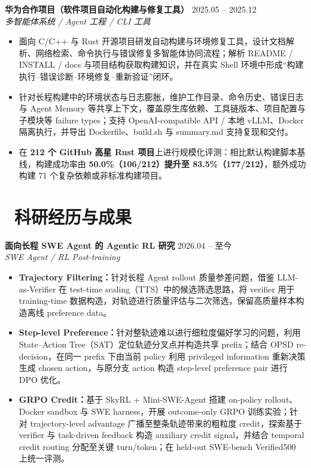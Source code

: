 \documentclass[10pt]{article}
\newlength{\interProjectSpacing}
\newcommand{\projectsep}{\vspace{\interProjectSpacing}}
\newlength{\intraProjectTitleSep}
\newcommand{\titlebreak}{\\[\intraProjectTitleSep]}
\begin{document}
\textbf{华为合作项目（软件项目自动化构建与修复工具）} \hfill 2025.05 -- 2025.12 \titlebreak
\textit{多智能体系统 / Agent 工程 / CLI 工具}
\begin{itemize}
  \item 面向 C/C++ 与 Rust 开源项目研发自动构建与环境修复工具，设计文档解析、网络检索、命令执行与错误修复多智能体协同流程；解析 README / INSTALL / docs 与项目结构获取构建知识，并在真实 Shell 环境中形成“构建执行--错误诊断--环境修复--重新验证”闭环。
  \item 针对长程构建中的环境状态与日志膨胀，维护工作目录、命令历史、错误日志与 Agent Memory 等共享上下文，覆盖原生库依赖、工具链版本、项目配置与子模块等 failure types；支持 OpenAI-compatible API / 本地 vLLM、Docker 隔离执行，并导出 Dockerfile、build.sh 与 summary.md 支持复现和交付。
  \item 在 \textbf{212 个 GitHub 高星 Rust 项目}上进行规模化评测：相比默认构建脚本基线，构建成功率由 \textbf{50.0\%（106/212）提升至 83.5\%（177/212）}，额外成功构建 71 个复杂依赖或非标准构建项目。
\end{itemize}

\section{\makebox[\widthof{\faFlask}][c]{\color{CVBlue}\faFlask}\ 科研经历与成果}
\textbf{面向长程 SWE Agent 的 Agentic RL 研究} \hfill 2026.04 -- 至今 \titlebreak
\textit{SWE Agent / RL Post-training}
\begin{itemize}
  \item \textbf{Trajectory Filtering：}针对长程 Agent rollout 质量参差问题，借鉴 LLM-as-Verifier 在 test-time scaling（TTS）中的候选筛选思路，将 verifier 用于 training-time 数据构造，对轨迹进行质量评估与二次筛选，保留高质量样本构造离线 preference data。
  \item \textbf{Step-level Preference：}针对整轨迹难以进行细粒度偏好学习的问题，利用 State--Action Tree（SAT）定位轨迹分叉点并构造共享 prefix；结合 OPSD re-decision，在同一 prefix 下由当前 policy 利用 privileged information 重新决策生成 chosen action，与原分支 action 构造 step-level preference pair 进行 DPO 优化。
  \item \textbf{GRPO Credit：}基于 SkyRL + Mini-SWE-Agent 搭建 on-policy rollout、Docker sandbox 与 SWE harness，开展 outcome-only GRPO 训练实验；针对 trajectory-level advantage 广播至整条轨迹带来的粗粒度 credit，探索基于 verifier 与 task-driven feedback 构造 auxiliary credit signal，并结合 temporal credit routing 分配至关键 turn/token；在 held-out SWE-bench Verified500 上统一评测。
\end{itemize}
\projectsep
\end{document}

